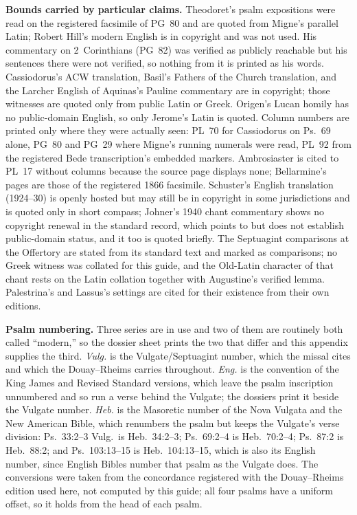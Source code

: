 \textbf{Bounds carried by particular claims.} Theodoret's psalm expositions
were read on the registered facsimile of PG~80 and are quoted from Migne's
parallel Latin; Robert Hill's modern English is in copyright and was not used.
His commentary on 2~Corinthians (PG~82) was verified as publicly reachable but
his sentences there were not verified, so nothing from it is printed as his
words. Cassiodorus's ACW translation, Basil's Fathers of the Church
translation, and the Larcher English of Aquinas's Pauline commentary are in
copyright; those witnesses are quoted only from public Latin or Greek. Origen's
Lucan homily has no public-domain English, so only Jerome's Latin is quoted.
Column numbers are printed only where they were actually seen: PL~70 for
Cassiodorus on Ps.\ 69 alone, PG~80 and PG~29 where Migne's running numerals
were read, PL~92 from the registered Bede transcription's embedded markers.
Ambrosiaster is cited to PL~17 without columns because the source page displays
none; Bellarmine's pages are those of the registered 1866 facsimile. Schuster's English translation (1924--30) is openly
hosted but may still be in copyright in some jurisdictions and is quoted only
in short compass; Johner's 1940 chant commentary shows no copyright renewal in
the standard record, which points to but does not establish public-domain
status, and it too is quoted briefly. The Septuagint comparisons at the
Offertory are stated from its standard text and marked as comparisons; no
Greek witness was collated for this guide, and the Old-Latin character of that
chant rests on the Latin collation together with Augustine's verified lemma.
Palestrina's and Lassus's settings are cited for their existence from their
own editions.

\textbf{Psalm numbering.} Three series are in use and two of them are
routinely both called ``modern,'' so the dossier sheet prints the two that
differ and this appendix supplies the third. \textit{Vulg.} is the
Vulgate/Septuagint number, which the missal cites and which the Douay--Rheims
carries throughout. \textit{Eng.} is the convention of the King James and
Revised Standard versions, which leave the psalm inscription unnumbered and so
run a verse behind the Vulgate; the dossiers print it beside the Vulgate
number. \textit{Heb.} is the Masoretic number of the Nova Vulgata and the New
American Bible, which renumbers the psalm but keeps the Vulgate's verse
division: Ps.\ 33:2--3 Vulg.\ is Heb.\ 34:2--3; Ps.\ 69:2--4 is Heb.\
70:2--4; Ps.\ 87:2 is Heb.\ 88:2; and Ps.\ 103:13--15 is Heb.\ 104:13--15,
which is also its English number, since English Bibles number that psalm as
the Vulgate does. The conversions were taken from the concordance registered
with the Douay--Rheims edition used here, not computed by this guide; all four
psalms have a uniform offset, so it holds from the head of each psalm.

